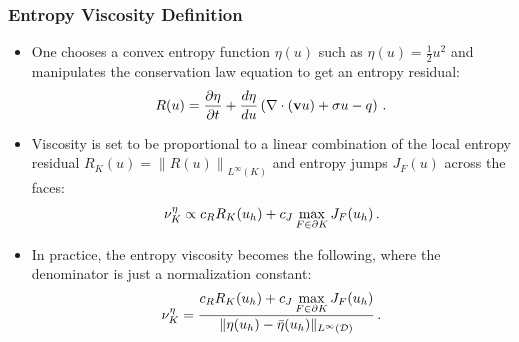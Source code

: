 \documentclass{beamer} \useoutertheme{infolines}
\begin{document}
\begin{frame}
\frametitle{Entropy Viscosity Definition}

\begin{itemize}
   \item One chooses a convex entropy function $\eta(u)$ such
   as $\eta(u)=\frac{1}{2}u^2$ and manipulates the
   conservation law equation to get an entropy residual:
   \begin{equation}
      R(u) = \frac{\partial \eta}{\partial t}
      + \frac{d\eta}{du}\left(\nabla\cdot(\mathbf{v}u)
      + \sigma u 
      - q \right) \,.
   \end{equation}
   \item Viscosity is set to be proportional to a linear combination
      of the local entropy residual $R_K(u) = \left\|R(u)\right\|_{L^\infty(K)}$
      and entropy jumps $J_F(u)$ across the faces:
      \begin{equation}
         \nu^{\eta}_K \propto c_R R_K(u_h)
         + c_J\max\limits_{F\in\partial K}J_F(u_h) \,.
      \end{equation}
   \item In practice, the entropy viscosity becomes the following, where the
      denominator is just a normalization constant:
      \begin{equation}
         \nu^{\eta}_K = \frac{c_R R_K(u_h)
         + c_J\max\limits_{F\in\partial K}J_F(u_h)}
         {\|\eta(u_h)-\bar{\eta}(u_h)\|_{L^\infty(\mathcal{D})}} \,.
      \end{equation}
\end{itemize}
   
\end{frame}
\end{document}
